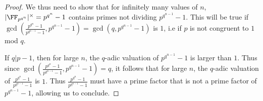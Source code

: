 \documentclass[12pt,oneside]{article}
\newcounter{counter}
\newtheorem{qst}[counter]{Question}
\newtheorem{cnj}[counter]{Conjecture}
\begin{document}
\begin{proof}
	We thus need to show that for infinitely many values of $n$, $|\FF_{p^{q^n}}|^\times = p^{q^n}-1$ contains primes not dividing $p^{q^{n-1}}-1$. This will be true if $\gcd(\frac{p^{q^n}-1}{p^{q^{n-1}}-1},p^{q^{n-1}}-1) = \gcd(q,p^{q^{n-1}}-1)$ is $1$, i.e if $p$ is not congruent to $1$ mod $q$.
	
	If $q|p-1$, then for large $n$, the $q$-adic valuation of $p^{q^{n-1}}-1$ is larger than $1$. Thus since $\gcd(\frac{p^{q^n}-1}{p^{q^{n-1}}-1},p^{q^{n-1}}-1) = q$, it follows that for large $n$, the $q$-adic valuation of $\frac{p^{q^n}-1}{p^{q^{n-1}}-1}$ is $1$. Thus $\frac{p^{q^n}-1}{p^{q^{n-1}}-1}$ must have a prime factor that is not a prime factor of $p^{q^{n-1}}-1$, allowing us to conclude.
\end{proof} 

%	
%
	
	
	
%	
	

%
%	
%	
\end{document}
